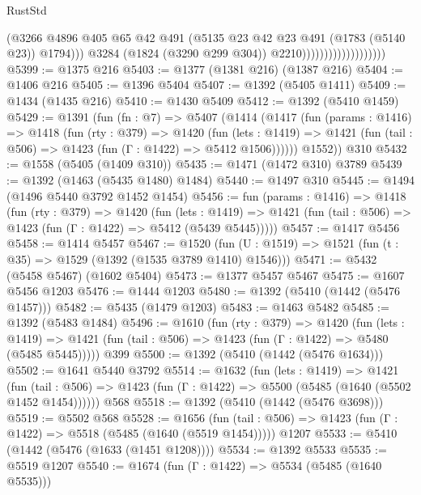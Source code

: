 \begin{lexlean}{RustStd}
\begin{coremodule}
                                            (@3266
                                              @4896
                                              @405
                                              @65
                                              @42
                                              @491
                                              (@5135 @23 @42 @23 @491 (@1783 (@5140 @23)) @1794)))
                                          @3284
                                          (@1824 (@3290 @299 @304))
                                          @2210)))))))))))))))))))
@5399 := @1375 @216
@5403 := @1377 (@1381 @216) (@1387 @216)
@5404 := @1406 @216
@5405 := @1396 @5404
@5407 := @1392 (@5405 @1411)
@5409 := @1434 (@1435 @216)
@5410 := @1430 @5409
@5412 := @1392 (@5410 @1459)
@5429 := @1391
    (fun (fn : @7) =>
    @5407
      (@1414
        (@1417
          (fun (params : @1416) =>
          @1418
            (fun (rty : @379) =>
            @1420
              (fun (lets : @1419) =>
              @1421 (fun (tail : @506) => @1423 (fun (Γ : @1422) => @5412 @1506))))))
        @1552))
    @310
@5432 := @1558 (@5405 (@1409 @310))
@5435 := @1471 (@1472 @310) @3789
@5439 := @1392 (@1463 (@5435 @1480) @1484)
@5440 := @1497 @310
@5445 := @1494 (@1496 @5440 @3792 @1452 @1454)
@5456 := fun (params : @1416) =>
  @1418
    (fun (rty : @379) =>
    @1420
      (fun (lets : @1419) =>
      @1421 (fun (tail : @506) => @1423 (fun (Γ : @1422) => @5412 (@5439 @5445)))))
@5457 := @1417 @5456
@5458 := @1414 @5457
@5467 := @1520 (fun (U : @1519) => @1521 (fun (t : @35) => @1529 (@1392 (@1535 @3789 @1410) @1546)))
@5471 := @5432 (@5458 @5467) (@1602 @5404)
@5473 := @1377 @5457 @5467
@5475 := @1607 @5456 @1203
@5476 := @1444 @1203
@5480 := @1392 (@5410 (@1442 (@5476 @1457)))
@5482 := @5435 (@1479 @1203)
@5483 := @1463 @5482
@5485 := @1392 (@5483 @1484)
@5496 := @1610
    (fun (rty : @379) =>
    @1420
      (fun (lets : @1419) =>
      @1421 (fun (tail : @506) => @1423 (fun (Γ : @1422) => @5480 (@5485 @5445)))))
    @399
@5500 := @1392 (@5410 (@1442 (@5476 @1634)))
@5502 := @1641 @5440 @3792
@5514 := @1632
    (fun (lets : @1419) =>
    @1421
      (fun (tail : @506) => @1423 (fun (Γ : @1422) => @5500 (@5485 (@1640 (@5502 @1452 @1454))))))
    @568
@5518 := @1392 (@5410 (@1442 (@5476 @3698)))
@5519 := @5502 @568
@5528 := @1656
    (fun (tail : @506) => @1423 (fun (Γ : @1422) => @5518 (@5485 (@1640 (@5519 @1454)))))
    @1207
@5533 := @5410 (@1442 (@5476 (@1633 (@1451 @1208))))
@5534 := @1392 @5533
@5535 := @5519 @1207
@5540 := @1674 (fun (Γ : @1422) => @5534 (@5485 (@1640 @5535)))

\end{coremodule}
\end{lexlean}
